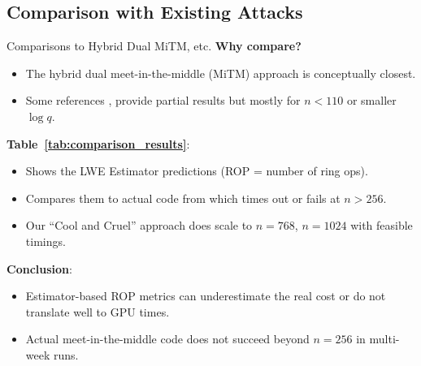 \documentclass{beamer}
\begin{document}
\subsection{Comparison with Existing Attacks}
\begin{frame}{Comparisons to Hybrid Dual MiTM, etc.}
  \textbf{Why compare?}
  \begin{itemize}
    \item The hybrid dual meet-in-the-middle (MiTM) approach \cite{ref_mitm} is conceptually closest.
    \item Some references \cite{ref_smalln}, \cite{ref_largen} provide partial results but mostly for $n<110$ or smaller $\log q$.
  \end{itemize}

  \vspace{0.3cm}
  \textbf{Table~\ref{tab:comparison_results}}:
  \begin{itemize}
    \item Shows the LWE Estimator predictions (ROP = number of ring ops).
    \item Compares them to actual code from \cite{ref_sparse} which times out or fails at $n>256$.
    \item Our “Cool and Cruel” approach does scale to $n=768$, $n=1024$ with feasible timings.
  \end{itemize}

  \vspace{0.3cm}
  \textbf{Conclusion}:
  \begin{itemize}
    \item Estimator-based ROP metrics can underestimate the real cost or do not translate well to GPU times.
    \item Actual meet-in-the-middle code \cite{ref_sparse} does not succeed beyond $n=256$ in multi-week runs.
  \end{itemize}
\end{frame}

\end{document}

